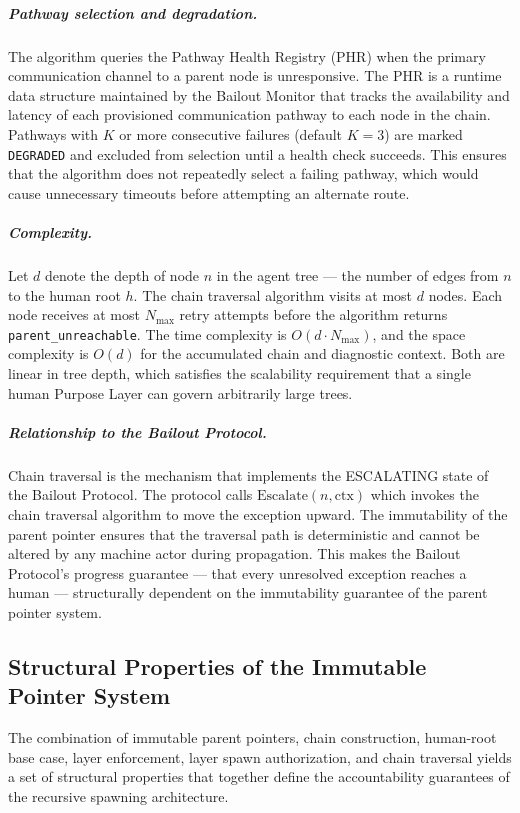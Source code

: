 \subparagraph{Pathway selection and degradation.} The algorithm queries the Pathway Health Registry (PHR) when the primary communication channel to a parent node is unresponsive. The PHR is a runtime data structure maintained by the Bailout Monitor that tracks the availability and latency of each provisioned communication pathway to each node in the chain. Pathways with $K$ or more consecutive failures (default $K = 3$) are marked \texttt{DEGRADED} and excluded from selection until a health check succeeds. This ensures that the algorithm does not repeatedly select a failing pathway, which would cause unnecessary timeouts before attempting an alternate route.

\subparagraph{Complexity.} Let $d$ denote the depth of node $n$ in the agent tree — the number of edges from $n$ to the human root $h$. The chain traversal algorithm visits at most $d$ nodes. Each node receives at most $N_{\max}$ retry attempts before the algorithm returns \texttt{parent\_unreachable}. The time complexity is $O(d \cdot N_{\max})$, and the space complexity is $O(d)$ for the accumulated chain and diagnostic context. Both are linear in tree depth, which satisfies the scalability requirement that a single human Purpose Layer can govern arbitrarily large trees.

\subparagraph{Relationship to the Bailout Protocol.} Chain traversal is the mechanism that implements the ESCALATING state of the Bailout Protocol. The protocol calls $\text{Escalate}(n, \text{ctx})$ which invokes the chain traversal algorithm to move the exception upward. The immutability of the parent pointer ensures that the traversal path is deterministic and cannot be altered by any machine actor during propagation. This makes the Bailout Protocol's progress guarantee — that every unresolved exception reaches a human — structurally dependent on the immutability guarantee of the parent pointer system.

\subsection{Structural Properties of the Immutable Pointer System}

The combination of immutable parent pointers, chain construction, human-root base case, \fact{} layer enforcement, \purpose{} layer spawn authorization, and chain traversal yields a set of structural properties that together define the accountability guarantees of the \bxthree{} recursive spawning architecture.


